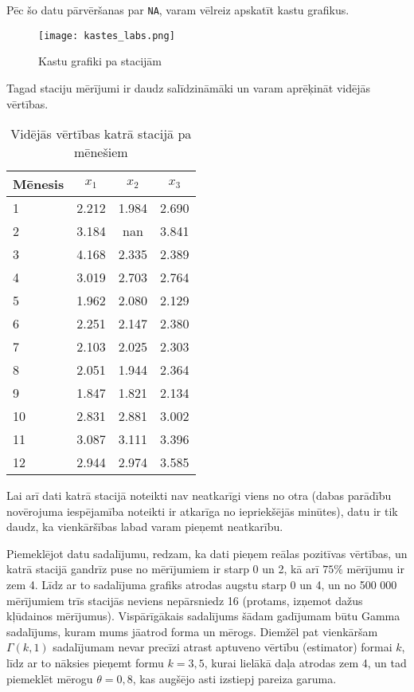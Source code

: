 \documentclass[12pt,a4paper]{article}
\begin{document}
Pēc šo datu pārvēršanas par \texttt{NA}, varam vēlreiz apskatīt kastu grafikus.
\begin{figure}[h]
    \centering
    \texttt{[image: kastes\_labs.png]}
    \caption{Kastu grafiki pa stacijām}
\end{figure}
Tagad staciju mērījumi ir daudz salīdzināmāki un varam aprēķināt vidējās vērtības.
\begin{table}
    \caption{Vidējās vērtības katrā stacijā pa mēnešiem}
    \centering
    \begin{tabular}{l|c c c}
    Mēnesis & \(x_1\) & \(x_2\) & \(x_3\) \\
        \hline
        1  &  2.212  &  1.984  &  2.690 \\
        2  &  3.184  &  nan  &  3.841 \\
        3  &  4.168  &  2.335  &  2.389 \\
        4  &  3.019  &  2.703  &  2.764 \\
        5  &  1.962  &  2.080  &  2.129 \\
        6  &  2.251  &  2.147  &  2.380 \\
        7  &  2.103  &  2.025  &  2.303 \\
        8  &  2.051  &  1.944  &  2.364 \\
        9  &  1.847  &  1.821  &  2.134 \\
        10  &  2.831  &  2.881  &  3.002 \\
        11  &  3.087  &  3.111  &  3.396 \\
        12  &  2.944  &  2.974  &  3.585
    \end{tabular}
\end{table}

Lai arī dati katrā stacijā noteikti nav neatkarīgi viens no otra (dabas parādību novērojuma iespējamība noteikti ir atkarīga no iepriekšējās minūtes), datu ir tik daudz, ka vienkāršības labad varam pieņemt neatkarību.

Piemeklējot datu sadalījumu, redzam, ka dati pieņem reālas pozitīvas vērtības, un katrā stacijā gandrīz puse no mērījumiem ir starp 0 un 2, kā arī \(75\%\) mērījumu ir zem 4. Līdz ar to sadalījuma grafiks atrodas augstu starp 0 un 4, un no 500 000 mērījumiem trīs stacijās neviens nepārsniedz 16 (protams, izņemot dažus kļūdainos mērījumus). Vispārīgākais sadalījums šādam gadījumam būtu Gamma sadalījums, kuram mums jāatrod forma un mērogs. Diemžēl pat vienkāršam \(\Gamma(k, 1)\) sadalījumam nevar precīzi atrast aptuveno vērtību (estimator) formai \(k\), līdz ar to nāksies pieņemt formu \(k=3,5\), kurai lielākā daļa atrodas zem 4, un tad piemeklēt mērogu \(\theta=0,8\), kas augšējo asti izstiepj pareiza garuma.
\end{document}
